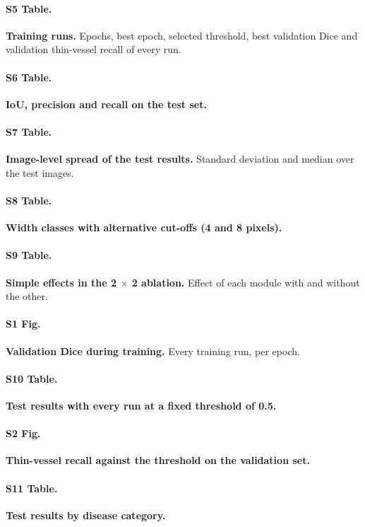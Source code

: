\paragraph*{S5 Table.}
\label{si:runs}
{\bf Training runs.} Epochs, best epoch, selected threshold, best validation Dice and validation thin-vessel recall of every
run.

\paragraph*{S6 Table.}
\label{si:overlap}
{\bf IoU, precision and recall on the test set.}

\paragraph*{S7 Table.}
\label{si:imagelevel}
{\bf Image-level spread of the test results.} Standard deviation and median over the test images.

\paragraph*{S8 Table.}
\label{si:width}
{\bf Width classes with alternative cut-offs (4 and 8 pixels).}

\paragraph*{S9 Table.}
\label{si:simple}
{\bf Simple effects in the 2 $\times$ 2 ablation.} Effect of each module with and without the other.

\paragraph*{S1 Fig.}
\label{si:training}
{\bf Validation Dice during training.} Every training run, per epoch.

\paragraph*{S10 Table.}
\label{si:fixed}
{\bf Test results with every run at a fixed threshold of 0.5.}

\paragraph*{S2 Fig.}
\label{si:thrval}
{\bf Thin-vessel recall against the threshold on the validation set.}

\paragraph*{S11 Table.}
\label{si:disease}
{\bf Test results by disease category.}


